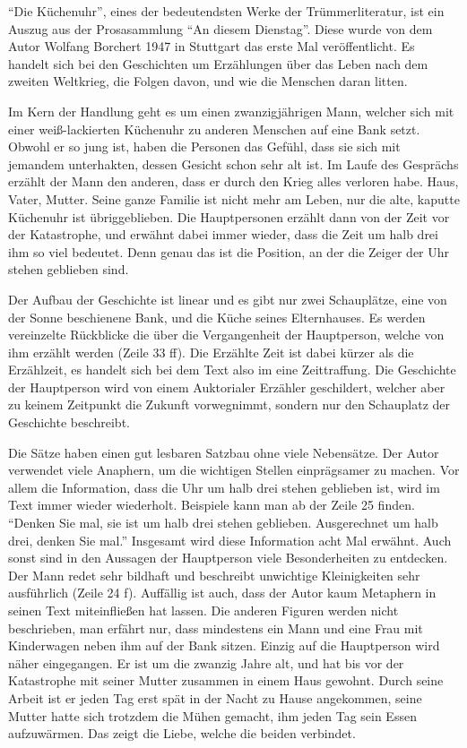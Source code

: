 “Die Küchenuhr”, eines der bedeutendsten Werke der Trümmerliteratur, ist ein Auszug aus der Prosasammlung “An diesem Dienstag”. Diese wurde von dem Autor Wolfang Borchert 1947 in Stuttgart das erste Mal veröffentlicht. Es handelt sich bei den Geschichten um Erzählungen über das Leben nach dem zweiten Weltkrieg, die Folgen davon, und wie die Menschen daran litten. 

Im Kern der Handlung geht es um einen zwanzigjährigen Mann, welcher sich mit einer weiß-lackierten Küchenuhr zu anderen Menschen auf eine Bank setzt. Obwohl er so jung ist, haben die Personen das Gefühl, dass sie sich mit jemandem unterhakten, dessen Gesicht schon sehr alt ist. Im Laufe des Gesprächs erzählt der Mann den anderen, dass er durch den Krieg alles verloren habe. Haus, Vater, Mutter. Seine ganze Familie ist nicht mehr am Leben, nur die alte, kaputte Küchenuhr ist übriggeblieben. Die Hauptpersonen erzählt dann von der Zeit vor der Katastrophe, und erwähnt dabei immer wieder, dass die Zeit um halb drei ihm so viel bedeutet. Denn genau das ist die Position, an der die Zeiger der Uhr stehen geblieben sind. 

Der Aufbau der Geschichte ist linear und es gibt nur zwei Schauplätze, eine von der Sonne beschienene Bank, und die Küche seines Elternhauses. Es werden vereinzelte Rückblicke die über die Vergangenheit der Hauptperson, welche von ihm erzählt werden (Zeile 33 ff). Die Erzählte Zeit ist dabei kürzer als die Erzählzeit, es handelt sich bei dem Text also im eine Zeittraffung. Die Geschichte der Hauptperson wird von einem Auktorialer Erzähler geschildert, welcher aber zu keinem Zeitpunkt die Zukunft vorwegnimmt, sondern nur den Schauplatz der Geschichte beschreibt.  

Die Sätze haben einen gut lesbaren Satzbau ohne viele Nebensätze. Der Autor verwendet viele Anaphern, um die wichtigen Stellen einprägsamer zu machen. Vor allem die Information, dass die Uhr um halb drei stehen geblieben ist, wird im Text immer wieder wiederholt. Beispiele kann man ab der Zeile 25 finden. “Denken Sie mal, sie ist um halb drei stehen geblieben. Ausgerechnet um halb drei, denken Sie mal.” Insgesamt wird diese Information acht Mal erwähnt. Auch sonst sind in den Aussagen der Hauptperson viele Besonderheiten zu entdecken. Der Mann redet sehr bildhaft und beschreibt unwichtige Kleinigkeiten sehr ausführlich (Zeile 24 f). Auffällig ist auch, dass der Autor kaum Metaphern in seinen Text miteinfließen hat lassen. Die anderen Figuren werden nicht beschrieben, man erfährt nur, dass mindestens ein Mann und eine Frau mit Kinderwagen neben ihm auf der Bank sitzen. Einzig auf die Hauptperson wird näher eingegangen. Er ist um die zwanzig Jahre alt, und hat bis vor der Katastrophe mit seiner Mutter zusammen in einem Haus gewohnt. Durch seine Arbeit ist er jeden Tag erst spät in der Nacht zu Hause angekommen, seine Mutter hatte sich trotzdem die Mühen gemacht, ihm jeden Tag sein Essen aufzuwärmen. Das zeigt die Liebe, welche die beiden verbindet. 

